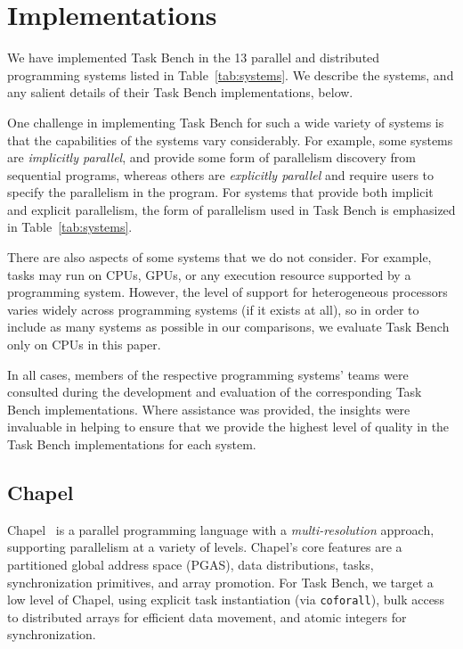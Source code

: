 \section{Implementations}
\label{sec:implementation}



We have implemented Task Bench in the 13 parallel and distributed
programming systems listed in Table~\ref{tab:systems}. We describe the
systems, and any salient details of their Task Bench implementations,
below.

One challenge in implementing Task Bench for such a wide variety of
systems is that the capabilities of the systems vary considerably. For
example, some systems are \emph{implicitly parallel}, and provide some
form of parallelism discovery from sequential programs, whereas others
are \emph{explicitly parallel} and require users to specify the
parallelism in the program. For systems that provide both implicit and explicit parallelism, the form of parallelism used in Task Bench is emphasized in Table~\ref{tab:systems}.


There are also aspects of some systems that we do not consider. For
example, tasks may run on CPUs, GPUs, or any execution resource
supported by a programming system. However, the level of support for
heterogeneous processors varies widely across programming systems (if it exists at all), so
in order to include as many systems as possible in our comparisons, we
evaluate Task Bench only on CPUs in this paper.

In all cases, members of the respective programming systems' teams
were consulted during the development and evaluation of the
corresponding Task Bench implementations. Where assistance was provided, the insights were invaluable
in helping to ensure that we provide the highest level of quality in the Task
Bench implementations for each system.

\subsection{Chapel}

Chapel~\cite{Chapel15} is a parallel programming language
with a \emph{multi-res\-o\-lu\-tion} approach, supporting parallelism at a variety of
levels. Chapel's core features are a partitioned global address space
(PGAS), data distributions, tasks,
synchronization primitives, and array promotion. For Task Bench, we target a low level of
Chapel, using explicit task instantiation (via
\lstinline[language=Chapel]{coforall}), bulk access to distributed
arrays for efficient data movement, and atomic integers for
synchronization.

